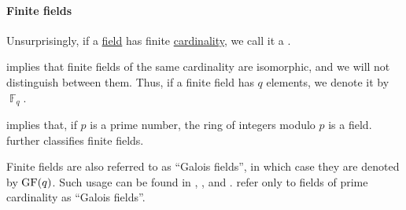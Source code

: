 \paragraph{Finite fields}

\begin{definition}\label{def:finite_field}\mimprovised
  Unsurprisingly, if a \hyperref[def:field]{field} has finite \hyperref[thm:cardinality_existence]{cardinality}, we call it a .

   implies that finite fields of the same cardinality are isomorphic, and we will not distinguish between them. Thus, if a finite field has \( q \) elements, we denote it by \( \BbbF_q \).
\end{definition}
\begin{comments}
  \item {} implies that, if \( p \) is a prime number, the ring of integers modulo \( p \) is a field.  further classifies finite fields.

  \item Finite fields are also referred to as \enquote{Galois fields}, in which case they are denoted by \( \op{GF}(q) \). Such usage can be found in , ,  and .  refer only to fields of prime cardinality as \enquote{Galois fields}.
\end{comments}

